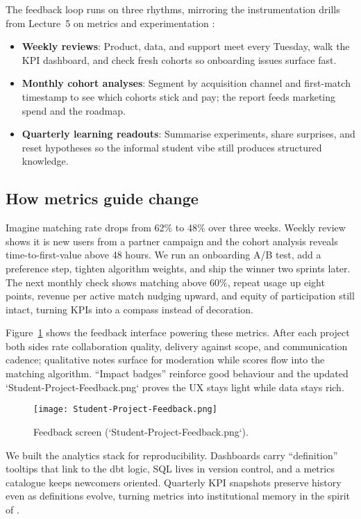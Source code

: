 The feedback loop runs on three rhythms, mirroring the instrumentation drills from Lecture~5 on metrics and experimentation \citep{Lecture05}:
\begin{itemize}
    \item \textbf{Weekly reviews}: Product, data, and support meet every Tuesday, walk the KPI dashboard, and check fresh cohorts so onboarding issues surface fast.
    \item \textbf{Monthly cohort analyses}: Segment by acquisition channel and first-match timestamp to see which cohorts stick and pay; the report feeds marketing spend and the roadmap.
    \item \textbf{Quarterly learning readouts}: Summarise experiments, share surprises, and reset hypotheses so the informal student vibe still produces structured knowledge.
\end{itemize}

\subsection*{How metrics guide change}
Imagine matching rate drops from 62\% to 48\% over three weeks. Weekly review shows it is new users from a partner campaign and the cohort analysis reveals time-to-first-value above 48 hours. We run an onboarding A/B test, add a preference step, tighten algorithm weights, and ship the winner two sprints later. The next monthly check shows matching above 60\%, repeat usage up eight points, revenue per active match nudging upward, and equity of participation still intact, turning KPIs into a compass instead of decoration.

Figure~\ref{fig:feedback-screen} shows the feedback interface powering these metrics. After each project both sides rate collaboration quality, delivery against scope, and communication cadence; qualitative notes surface for moderation while scores flow into the matching algorithm. ``Impact badges'' reinforce good behaviour and the updated `Student-Project-Feedback.png` proves the UX stays light while data stays rich.

\begin{figure}[h]
  \centering
  \texttt{[image: Student-Project-Feedback.png]}
  \caption{Feedback screen (`Student-Project-Feedback.png`).}
  \label{fig:feedback-screen}
\end{figure}

We built the analytics stack for reproducibility. Dashboards carry ``definition'' tooltips that link to the dbt logic, SQL lives in version control, and a metrics catalogue keeps newcomers oriented. Quarterly KPI snapshots preserve history even as definitions evolve, turning metrics into institutional memory in the spirit of \citet{Choudary2016}.
